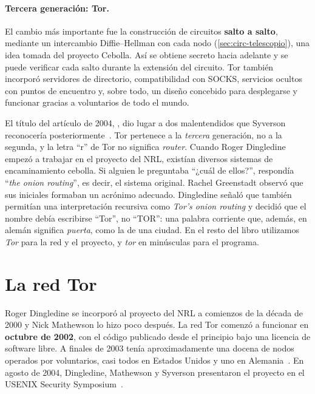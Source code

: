 \paragraph{Tercera generación: Tor.} El cambio más importante fue la construcción de circuitos \textbf{salto a salto}, mediante un intercambio Diffie--Hellman con cada nodo (\cref{sec:circ-telescopio}), una idea tomada del proyecto Cebolla. Así se obtiene secreto hacia adelante y se puede verificar cada salto durante la extensión del circuito. Tor también incorporó servidores de directorio, compatibilidad con SOCKS, servicios ocultos con puntos de encuentro y, sobre todo, un diseño concebido para desplegarse y funcionar gracias a voluntarios de todo el mundo.

\begin{storia}[El nombre]
El título del artículo de 2004, , dio lugar a dos malentendidos que Syverson reconocería posteriormente~\cite{syverson2011peel}. Tor pertenece a la \emph{tercera} generación, no a la segunda, y la letra \enquote{r} de Tor no significa \emph{router}. Cuando Roger Dingledine empezó a trabajar en el proyecto del NRL, existían diversos sistemas de encaminamiento cebolla. Si alguien le preguntaba \enquote{¿cuál de ellos?}, respondía \enquote{\emph{the onion routing}}, es decir, el sistema original. Rachel Greenstadt observó que sus iniciales formaban un acrónimo adecuado. Dingledine señaló que también permitían una interpretación recursiva como \emph{Tor's onion routing} y decidió que el nombre debía escribirse \enquote{Tor}, no \enquote{TOR}: una palabra corriente que, además, en alemán significa \emph{puerta}, como la de una ciudad. En el resto del libro utilizamos \emph{Tor} para la red y el proyecto, y \emph{tor} en minúsculas para el programa.
\end{storia}

\section{La red Tor}\label{sec:nascita-rete}

Roger Dingledine se incorporó al proyecto del NRL a comienzos de la década de 2000 y Nick Mathewson lo hizo poco después. La red Tor comenzó a funcionar en \textbf{octubre de 2002}, con el código publicado desde el principio bajo una licencia de software libre. A finales de 2003 tenía aproximadamente una docena de nodos operados por voluntarios, casi todos en Estados Unidos y uno en Alemania~\cite{torhistory}. En agosto de 2004, Dingledine, Mathewson y Syverson presentaron el proyecto en el USENIX Security Symposium~\cite{dingledine2004tor}.

